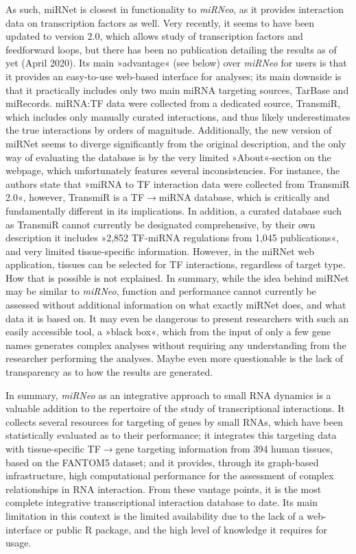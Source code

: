 As such, miRNet\cite{Fan2016} is closest in functionality to \emph{miRNeo}, as it provides interaction data on transcription factors as well. Very recently, it seems to have been updated to version 2.0, which allows study of transcription factors and feedforward loops, but there has been no publication detailing the results as of yet (April 2020). Its main »advantage« (see below) over \emph{miRNeo} for users is that it provides an easy-to-use web-based interface for analyses; its main downside is that it practically includes only two main miRNA targeting sources, TarBase and miRecords. miRNA:TF data were collected from a dedicated source, TransmiR, which includes only manually curated interactions, and thus likely underestimates the true interactions by orders of magnitude. Additionally, the new version of miRNet seems to diverge significantly from the original description,\cite{Fan2016} and the only way of evaluating the database is by the very limited »About«-section on the webpage, which unfortunately features several inconsistencies. For instance, the authors state that »miRNA to TF interaction data were collected from TransmiR 2.0«, however, TransmiR is a TF$\to$miRNA database, which is critically and fundamentally different in its implications. In addition, a curated database such as TransmiR cannot currently be designated comprehensive, by their own description it includes »2,852 TF-miRNA regulations from 1,045 publications«, and very limited tissue-specific information. However, in the miRNet web application, tissues can be selected for TF interactions, regardless of target type. How that is possible is not explained. In summary, while the idea behind miRNet may be similar to \emph{miRNeo}, function and performance cannot currently be assessed without additional information on what exactly miRNet does, and what data it is based on. It may even be dangerous to present researchers with such an easily accessible tool, a »black box«, which from the input of only a few gene names generates complex analyses without requiring any understanding from the researcher performing the analyses. Maybe even more questionable is the lack of transparency as to how the results are generated.

In summary, \emph{miRNeo} as an integrative approach to small RNA dynamics is a valuable addition to the repertoire of the study of transcriptional interactions. It collects several resources for targeting of genes by small RNAs, which have been statistically evaluated as to their performance; it integrates this targeting data with tissue-specific TF$\to$gene targeting information from 394 human tissues, based on the \mbox{FANTOM5} dataset; and it provides, through its graph-based infrastructure, high computational performance for the assessment of complex relationships in RNA interaction. From these vantage points, it is the most complete integrative transcriptional interaction database to date. Its main limitation in this context is the limited availability due to the lack of a web-interface or public R package, and the high level of knowledge it requires for usage.

